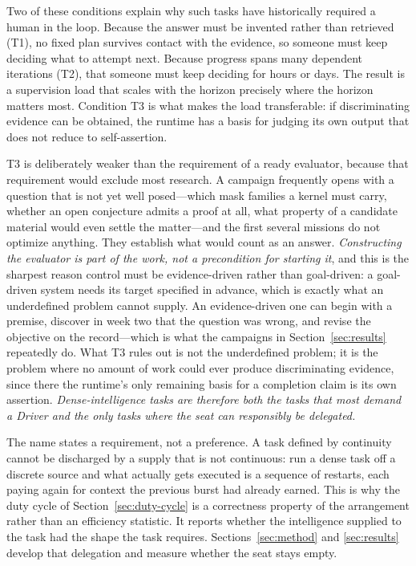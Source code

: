Two of these conditions explain why such tasks have historically required a human in
the loop. Because the answer must be invented rather than retrieved (T1), no fixed
plan survives contact with the evidence, so someone must keep deciding what to
attempt next. Because progress spans many dependent iterations (T2), that someone
must keep deciding for hours or days. The result is a supervision load that scales
with the horizon precisely where the horizon matters most. Condition T3 is what makes
the load transferable: if discriminating evidence can be obtained, the runtime has a
basis for judging its own output that does not reduce to self-assertion.

T3 is deliberately weaker than the requirement of a ready evaluator, because that
requirement would exclude most research. A campaign frequently opens with a question
that is not yet well posed---which mask families a kernel must carry, whether an
open conjecture admits a proof at all, what property of a candidate material would
even settle the matter---and the first several missions do not optimize anything.
They establish what would count as an answer. \emph{Constructing the evaluator is
part of the work, not a precondition for starting it}, and this is the sharpest
reason control must be evidence-driven rather than goal-driven: a goal-driven system
needs its target specified in advance, which is exactly what an underdefined problem
cannot supply. An evidence-driven one can begin with a premise, discover in week two
that the question was wrong, and revise the objective on the record---which is what
the campaigns in Section~\ref{sec:results} repeatedly do. What T3 rules out is not
the underdefined problem; it is the problem where no amount of work could ever
produce discriminating evidence, since there the runtime's only remaining basis for a
completion claim is its own assertion. \emph{Dense-intelligence tasks
are therefore both the tasks that most demand a Driver and the only tasks where the
seat can responsibly be delegated.}

The name states a requirement, not a preference. A task defined by continuity cannot
be discharged by a supply that is not continuous: run a dense task off a discrete
source and what actually gets executed is a sequence of restarts, each paying again
for context the previous burst had already earned. This is why the duty cycle of
Section~\ref{sec:duty-cycle} is a correctness property of the arrangement rather than
an efficiency statistic. It reports whether the intelligence supplied to the task
had the shape the task requires. Sections~\ref{sec:method} and \ref{sec:results}
develop that delegation and measure whether the seat stays empty.

